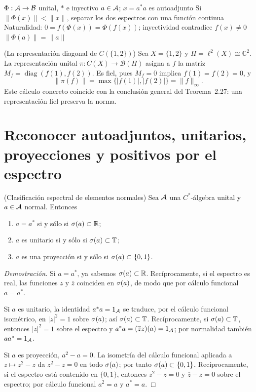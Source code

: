 \proofdiagrambranch
{$\Phi:\mathcal A\to\mathcal B$ unital, $*$ e inyectivo}
{$a\in\mathcal A$; $x=a^*a$ es autoadjunto}
{Si $\|\Phi(x)\|<\|x\|$, separar los dos espectros con una función continua}
{Naturalidad: $0=f(\Phi(x))=\Phi(f(x))$; inyectividad contradice $f(x)\neq0$}
{$\|\Phi(a)\|=\|a\|$}

\begin{cthejemplo}{(La representación diagonal de $C(\{1,2\})$)}
Sea $X=\{1,2\}$ y $H=\ell^2(X)\cong\mathbb C^2$.
La representación unital $\pi:C(X)\to\mathcal B(H)$ asigna a
$f$ la matriz $M_f=\operatorname{diag}(f(1),f(2))$.
Es fiel, pues $M_f=0$ implica $f(1)=f(2)=0$, y
\[
 \|\pi(f)\|=\max\{|f(1)|,|f(2)|\}=\|f\|_\infty.
\]
Este cálculo concreto coincide con la conclusión general del
Teorema~2.27: una representación fiel preserva la norma.
\end{cthejemplo}

\section{Reconocer autoadjuntos, unitarios, proyecciones y positivos por el espectro}

\begin{cthproposicion}{(Clasificación espectral de elementos normales)}
Sea $\mathcal A$ una $C^*$-álgebra unital y $a\in\mathcal A$ normal. Entonces
\begin{enumerate}[label=(\roman*)]
\item $a=a^*$ si y sólo si $\sigma(a)\subset\mathbb R$;
\item $a$ es unitario si y sólo si $\sigma(a)\subset\mathbb T$;
\item $a$ es una proyección si y sólo si $\sigma(a)\subset\{0,1\}$.
\end{enumerate}
\end{cthproposicion}

\begin{proof}[Demostración]
Si $a=a^*$, ya sabemos $\sigma(a)\subset\mathbb R$. Recíprocamente, si el espectro es real,
las funciones $z$ y $\overline z$ coinciden en $\sigma(a)$, de modo que por cálculo funcional
$a=a^*$.

Si $a$ es unitario, la identidad $a^*a=1_\mathcal A$ se traduce, por el cálculo funcional
isométrico, en $|z|^2=1$ sobre $\sigma(a)$; así $\sigma(a)\subset\mathbb T$.
Recíprocamente, si
$\sigma(a)\subset\mathbb T$, entonces $|z|^2=1$ sobre el espectro y
$a^*a=(\overline z z)(a)=1_\mathcal A$; por normalidad también $aa^*=1_\mathcal A$.

Si $a$ es proyección, $a^2-a=0$. La isometría del cálculo funcional aplicada
a $z\mapsto z^2-z$ da $z^2-z=0$ en todo $\sigma(a)$; por tanto
$\sigma(a)\subset\{0,1\}$. Recíprocamente, si el espectro
está contenido en $\{0,1\}$, entonces $z^2-z=0$ y $\overline z-z=0$ sobre el espectro; por cálculo
funcional $a^2=a$ y $a^*=a$.
\end{proof}

